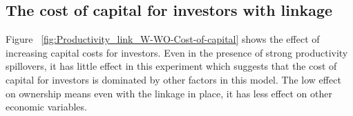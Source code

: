 \subsection{The cost of capital for investors  with linkage}
Figure ~\ref{fig:Productivity_link_W-WO-Cost-of-capital} %
shows the effect of increasing capital costs for investors. Even in the presence of strong productivity spillovers, it has little effect in this experiment which suggests that the cost of capital for investors is dominated by other factors in this model. The low effect on ownership means even with the linkage in place, it has less effect on other economic variables. 
